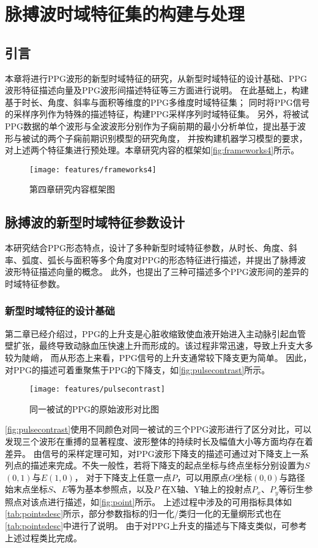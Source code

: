 \chapter{脉搏波时域特征集的构建与处理}
\section{引言}
本章将进行PPG波形的新型时域特征的研究，从新型时域特征的设计基础、PPG波形特征描述向量及PPG波形间描述特征等三方面进行说明。
在此基础上，构建基于时长、角度、斜率与面积等维度的PPG多维度时域特征集；
同时将PPG信号的采样序列作为特殊的描述特征，构建PPG采样序列时域特征集。
另外，将被试PPG数据的单个波形与全波波形分别作为子痫前期的最小分析单位，提出基于波形与被试的两个子痫前期识别模型的研究角度，
并按构建机器学习模型的要求，对上述两个特征集进行预处理。本章研究内容的框架如\autoref{fig:frameworks4}所示。
\begin{figure}[htbp]
    \centering
    \texttt{[image: features/frameworks4]}
    \caption{\label{fig:frameworks4}第四章研究内容框架图}
\end{figure}

\section{脉搏波的新型时域特征参数设计}
本研究结合PPG形态特点，设计了多种新型时域特征参数，从时长、角度、斜率、弧度、弧长与面积等多个角度对PPG的形态特征进行描述，并提出了脉搏波波形特征描述向量的概念。
此外，也提出了三种可描述多个PPG波形间的差异的时域特征参数。

\subsection{新型时域特征的设计基础}

第二章已经介绍过，PPG的上升支是心脏收缩致使血液开始进入主动脉引起血管壁扩张，最终导致动脉血压快速上升而形成的\cite{PPGYY}。该过程非常迅速，导致上升支大多较为陡峭，
而从形态上来看，PPG信号的上升支通常较下降支更为简单\cite{PPGYY,Chen2021}。
因此，对PPG的描述可着重聚焦于PPG的下降支，如\autoref{fig:pulsecontrast}所示。
\begin{figure}[htbp]
    \centering
    \texttt{[image: features/pulsecontrast]}
    \caption{\label{fig:pulsecontrast}同一被试的PPG的原始波形对比图}
\end{figure}

\autoref{fig:pulsecontrast}使用不同颜色对同一被试的三个PPG波形进行了区分对比，可以发现三个波形在重搏的显著程度、波形整体的持续时长及幅值大小等方面均存在着差异。
由信号的采样定理可知，对PPG波形下降支的描述可通过对下降支上一系列点的描述来完成。不失一般性，若将下降支的起点坐标与终点坐标分别设置为$S$$(0,1)$与$E$$(1,0)$，
对于下降支上任意一点$P$，可以用原点$O$坐标$(0,0)$与路径始末点坐标$S$、$E$等为基本参照点，以及$P$
在X轴、Y轴上的投射点$P_x$、$P_y$等衍生参照点对该点进行描述，如\autoref{fig:point}所示。
上述过程中涉及的可用指标具体如\autoref{tab:pointsdesc}所示，部分参数指标的归一化/类归一化的无量纲形式也在\autoref{tab:pointsdesc}中进行了说明。
由于对PPG上升支的描述与下降支类似，可参考上述过程类比完成。

